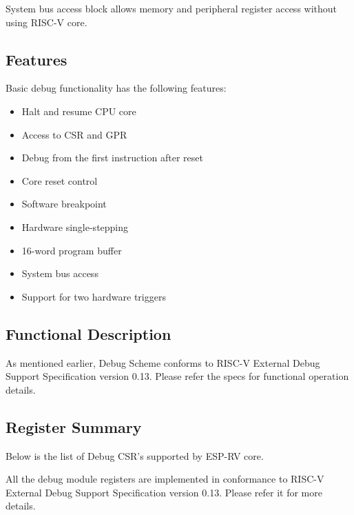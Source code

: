 \documentclass[main\_\_EN.tex]{subfiles}
\begin{document}
System bus access block allows memory and peripheral register access without using RISC-V core.


\subsection{Features}
\label{sec:riscvcpu-dbg-features}
Basic debug functionality has the following features:

\begin{itemize}
    \item {Halt and resume CPU core}
    \item {Access to CSR and GPR}
    \item {Debug from the first instruction after reset}
    \item {Core reset control}
    \item {Software breakpoint}
    \item {Hardware single-stepping}
    \item {16-word program buffer}
    \item {System bus access}
    \item {Support for two hardware triggers}
\end{itemize}

\subsection{Functional Description}
\label{sec:riscvcpu-dbg-func-descr}

As mentioned earlier, Debug Scheme conforms to RISC-V External Debug Support Specification version 0.13. Please refer the specs for functional operation details.


\hypertarget{riscvcpu-dbg-reg-summ}{}
\subsection{Register Summary}
\label{sec:riscvcpu-dbg-reg-summ}


Below is the list of Debug CSR's supported by ESP-RV core.


All the debug module registers are implemented in conformance to RISC-V External Debug Support Specification version 0.13. Please refer it for more details.

\end{document}
